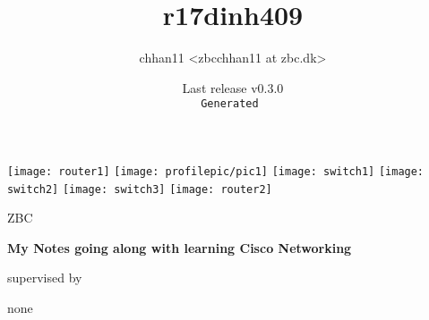 
\title{r17dinh409}
\def\thesubject{My Notes going along with learning Cisco Networking}
\def\theinstitution{ZBC}

\author{chhan11 <zbcchhan11 at zbc.dk>}
\def\thesupervisor{none}

\def\theversion{v0.3.0}
\date{{\footnotesize Last release \theversion\\%
    \texttt{\color{Gray}Generated \utccurrenttime}}}

\begin{titlepage}
    \centering
    \texttt{[image: router1]}
    \texttt{[image: profilepic/pic1]}
    \texttt{[image: switch1]}
    \texttt{[image: switch2]}
    \texttt{[image: switch3]}
    \texttt{[image: router2]}\par\vspace{1cm}
    {\scshape\LARGE \theinstitution\par}
    \vspace{1cm}
    {\scshape\Large \thetitle\par}
    \vspace{1.5cm}
    {\huge\bfseries \thesubject\par}
    \vspace{2cm}
    {\Large\itshape \theauthor\par}
    \vfill
    supervised by\par
    \thesupervisor
    
    \vfill
    
    {\large \thedate\par}
\end{titlepage}
